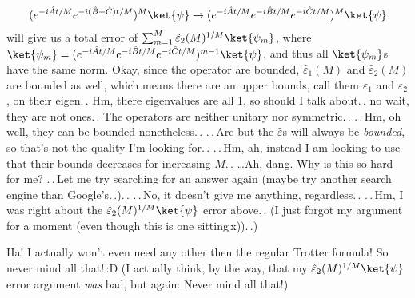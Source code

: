 \documentclass{report}
\begin{document}
\begin{align}
\begin{aligned}
	(e^{-i \hat A t / M } e^{-i (\hat B + \hat C) t / M})^M \ket{\psi} \to
		(e^{-i \hat A t / M }  e^{-i \hat B t / M } e^{-i \hat C t / M})^M \ket{\psi}
\end{aligned}
\end{align} 
will give us a total error of $\sum_{m=1}^{M} \hat \varepsilon_2(M)^{1/M} \ket{\psi_m}$, where $\ket{\psi_m} = (e^{-i \hat A t / M }  e^{-i \hat B t / M } e^{-i \hat C t / M})^{m-1} \ket{\psi}$, and thus all $\ket{\psi_m}$s have the same norm. Okay, since the operator are bounded, $\hat \varepsilon_1(M)$ and $\hat \varepsilon_2(M)$ are bounded as well, which means there are an upper bounds, call them $\varepsilon_1$ and $\varepsilon_2$, on their eigen.\,. Hm, there eigenvalues are all 1, so should I talk about.\,. no wait, they are not ones.\,. The operators are neither unitary nor symmetric.\,. .\,.\,Hm, oh well, they can be bounded nonetheless.\,. .\,.\,Are but the $\hat \varepsilon$s will always be \emph{bounded}, so that's not the quality I'm looking for.\,. .\,.\,Hm, ah, instead I am looking to use that their bounds decreases for increasing $M$.\,. \ldots Ah, dang. Why is this so hard for me? .\,.\,Let me try searching for an answer again (maybe try another search engine than Google's.\,.).\,. .\,.\,No, it doesn't give me anything, regardless.\,. .\,.\,Hm, I was right about the $\hat \varepsilon_2(M)^{1/M} \ket{\psi}$ error above.\,. (I just forgot my argument for a moment (even though this is one sitting\,x)).\,.) %

Ha! I actually won't even need any other then the regular Trotter formula! So never mind all that!\,:D (I actually think, by the way, that my $\hat \varepsilon_2(M)^{1/M} \ket{\psi}$ error argument \emph{was} bad, but again: Never mind all that!)
\end{document}
